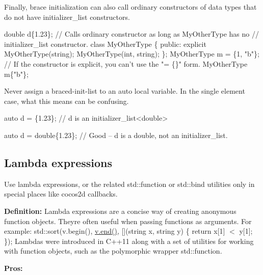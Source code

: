 Finally, brace initialization can also call ordinary constructors of data types that do not have initializer\+\_\+list constructors.


\begin{DoxyCode}
\textcolor{keywordtype}{double} d\{1.23\};
\textcolor{comment}{// Calls ordinary constructor as long as MyOtherType has no}
\textcolor{comment}{// initializer\_list constructor.}
\textcolor{keyword}{class }MyOtherType
\{
\textcolor{keyword}{public}:
    \textcolor{keyword}{explicit} MyOtherType(\textcolor{keywordtype}{string});
    MyOtherType(\textcolor{keywordtype}{int}, \textcolor{keywordtype}{string});
\};
MyOtherType m = \{1, \textcolor{stringliteral}{"b"}\};
\textcolor{comment}{// If the constructor is explicit, you can't use the "= \{\}" form.}
MyOtherType m\{\textcolor{stringliteral}{"b"}\};
\end{DoxyCode}


Never assign a braced-\/init-\/list to an auto local variable. In the single element case, what this means can be confusing.


\begin{DoxyCode}
\textcolor{keyword}{auto} d = \{1.23\};        \textcolor{comment}{// d is an initializer\_list<double>}

\textcolor{keyword}{auto} d = \textcolor{keywordtype}{double}\{1.23\};  \textcolor{comment}{// Good -- d is a double, not an initializer\_list.}
\end{DoxyCode}


\subsection*{Lambda expressions}

Use lambda expressions, or the related {\ttfamily std\+::function} or {\ttfamily std\+::bind} utilities only in special places like cocos2d callbacks.

{\bfseries Definition\+:} Lambda expressions are a concise way of creating anonymous function objects. They\textquotesingle{}re often useful when passing functions as arguments. For example\+: {\ttfamily std\+::sort(v.\+begin(), \hyperlink{Logger_8hpp_ac6f325c6cfe6189bc8e243daa184453b}{v.\+end()}, \mbox{[}\mbox{]}(string x, string y) \{ return x\mbox{[}1\mbox{]} $<$ y\mbox{[}1\mbox{]}; \});} Lambdas were introduced in C++11 along with a set of utilities for working with function objects, such as the polymorphic wrapper {\ttfamily std\+::function}.

{\bfseries Pros\+:}


